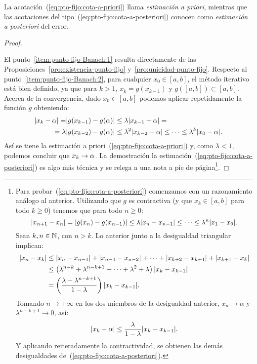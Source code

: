 La acotación~(\ref{eq:pto-fijo:cota-a-priori}) llama
\textit{estimación a priori}, mientras que
las acotaciones del tipo~(\ref{eq:pto-fijo:cota-a-posteriori}) conocen como
\textit{estimación a posteriori} del error.

\begin{proof}~\par
  El punto~\ref{item:punto-fijo-Banach:1} resulta
  directamente de las Proposiciones~\ref{pro:existencia-punto-fijo}
  y~\ref{pro:unicidad-punto-fijo}. Respecto al
  punto~\ref{item:punto-fijo-Banach:2}, para cualquier $x_0\in [a,b]$,
  el método iterativo está bien definido, ya que para $k>1$,
  $x_{k}=g(x_{k-1})$ y $g([a,b])\subset [a,b]$. Acerca de la
  convergencia, dado $x_0\in [a,b]$ podemos aplicar repetidamente la
  función $g$ obteniendo:
  \begin{equation}
    \begin{aligned}
      |x_k-\alpha| = &|g(x_{k-1})-g(\alpha)| \le \lambda
      |x_{k-1}-\alpha| = \\
      = \lambda &|g(x_{k-2})-g(\alpha)| \le \lambda^2
      |x_{k-2}-\alpha| \le \cdots \le \lambda^k |x_0-\alpha|.
    \end{aligned}\label{eq:1}
  \end{equation}
  Así se tiene la estimación a
  priori~(\ref{eq:pto-fijo:cota-a-priori}) y, como
  $\lambda<1$, podemos concluir que $x_k\to\alpha$.
  La demostración la estimación~(\ref{eq:pto-fijo:cota-a-posteriori})
  es algo más técnica y se relega a una nota a pie de página\footnote{
    Para probar~(\ref{eq:pto-fijo:cota-a-posteriori}) comenzamos con
    un razonamiento análogo al anterior. Utilizando que $g$ es
    contractiva (y que $x_k\in [a,b]$ para todo $k\ge 0$) tenemos que
    para todo $n \ge 0$:
    \begin{equation*}
      |x_{n+1}-x_{n}| =
      |g(x_{n})-g(x_{n-1})|\le\lambda|x_{n}-x_{n-1}| \le \cdots \le \lambda^n|x_1-x_0|.
    \end{equation*}
    Sean $k,n\in\operatorname{{\mathbb N}}$, con $n>k$. Lo anterior junto a la
    desigualdad triangular implican:
    \begin{align*}
      |x_n-x_k| &\le |x_n-x_{n-1}| + |x_{n-1}-x_{n-2}| + \cdots +
                  |x_{k+2}-x_{k+1}| + |x_{k+1}-x_{k}|
      \\
                &\le \left(\lambda^{n-k} + \lambda^{n-k+1} +\cdots+
                  \lambda^{2} + \lambda \right) |x_k-x_{k-1}|
      \\
                &=\left(\frac{\lambda-\lambda^{n-k+1}}{1-\lambda}\right)
                  |x_{k}-x_{k-1}|.
    \end{align*}
    Tomando $n\to+\infty$ en los dos miembros de la desigualdad
    anterior, $x_n\to\alpha$ y $\lambda^{n-k+1}\to 0$, así:
    $$
    |x_k-\alpha| \le \frac{\lambda}{1-\lambda}
    |x_{k}-x_{k-1}|.
    $$
    Y aplicando reiteradamente la contractividad, se obtienen las
    demás desigualdades de~(\ref{eq:pto-fijo:cota-a-posteriori}).
  }.
\end{proof}

